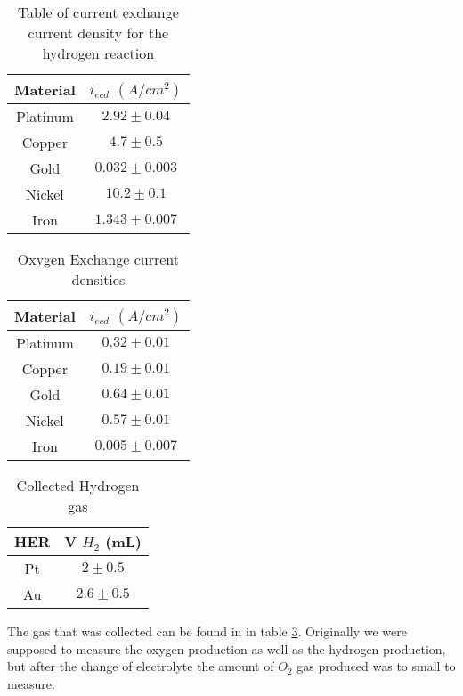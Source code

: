 \documentclass[twocolumn]{revtex4-2}
\begin{document}
\begin{table}[h]
\begin{tabular}{c | c}
Material & $i_{ecd}$ $(A/cm^2)$ \\
\hline
\hline
Platinum & $2.92 \pm 0.04$\\ 

Copper & $4.7 \pm 0.5$\\ 

Gold & $0.032 \pm 0.003$\\ 

Nickel & $10.2 \pm 0.1$\\ 

Iron & $1.343 \pm 0.007$\\ 

\end{tabular}
	\caption{Table of current exchange current density for the hydrogen reaction\label{table: ecd_H}}
\end{table}

\begin{table}[h]
	\begin{tabular}{c|c}
		Material & $i_{ecd}$ $(A/cm^2)$ \\
		\hline
		\hline
		Platinum & $0.32 \pm 0.01$\\ 

		Copper & $0.19 \pm 0.01$\\ 

		Gold & $0.64 \pm 0.01$\\ 

		Nickel & $0.57 \pm 0.01$\\ 

		Iron & $0.005 \pm 0.007$\\ 

	\end{tabular}
	\caption{Oxygen Exchange current densities\label{table: ecd_O}}
\end{table}

\begin{table}[h]
	\begin{tabular}{c | c}
		HER & V $H_2$ (mL) \\
		\hline
		\hline
		Pt &$ 2 \pm 0.5$ \\
		Au & $2.6 \pm 0.5$ \\
	\end{tabular}
	\caption{Collected Hydrogen gas\label{table: gases}}
\end{table}
\par
The gas that was collected can be found in in table \ref{table: gases}. Originally we were supposed to 
measure the oxygen production as well as the hydrogen production, but after  the change of electrolyte
the amount of $O_2$ gas produced was to small to measure.
\end{document}
